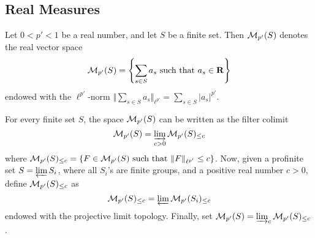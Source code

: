 \subsection{Real Measures}

\begin{definition}
  \label{real-measures}
  \leanok
  Let $0 < p' < 1$ be a real number, and let $S$ be a finite set.
  Then $\mathcal M_{p'}(S)$ denotes the real vector space
\[
\mathcal M_{p'}(S)=\left\{\sum_{s\in S}a_{s} \text{ such that } a_{s}\in \mathbf{R}\right\}
\]
endowed with the $\ell^{p'}$-norm $\Vert \sum_{s\in S}a_s\Vert_{\ell^{p'}}=\sum_{s\in S}\lvert a_s\rvert ^{p'}$.
\end{definition}
For every finite set $S$, the space $\mathcal M_{p'}(S)$ can be written as the filter colimit
\[
\mathcal M_{p'}(S)=\varinjlim_{c>0}\mathcal M_{p'}(S)_{\leq c}
\]
where $\mathcal M_{p'}(S)_{\leq c}=\left\{F \in \mathcal M_{p'}(S) \text{ such that } \Vert F \Vert_{\ell^{p'}}\leq c\right\}$. Now, given a profinite set $S=\varprojlim S_i$, where all $S_i$'s are finite groups, and a positive real number $c>0$, define $\mathcal M_{p'}(S)_{\leq c}$ as
\[
\mathcal M_{p'}(S)_{\leq c}=\varprojlim \mathcal M_{p'}(S_i)_{\leq c}
\]
endowed with the projective limit topology. Finally, set $\mathcal M_{p'}(S)=\varinjlim_{c}\mathcal M_{p'}(S)_{\leq c}$.